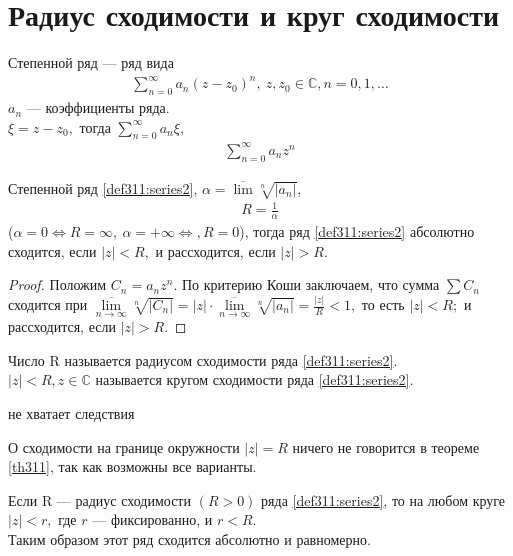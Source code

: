 \section{Радиус сходимости и круг сходимости}
\begin{definition}
  Степенной ряд --- ряд вида
  \begin{gather}
    \sum\limits_{n = 0}^{\infty} a_n(z - z_0)^n, \ z, z_0 \in \mathbb{C}, n = 0, 1, \dots
    \label{def311:series1}
  \end{gather}
  $a_n$ --- коэффициенты ряда. \\
  $\xi = z - z_0, $ тогда
  $\sum\limits_{n = 0}^{\infty} a_n \xi$,
  \begin{gather}
    \sum\limits_{n = 0}^{\infty} a_n z^n \label{def311:series2}
  \end{gather}
\end{definition}

\begin{theorem}
  \label{th311}
  Степенной ряд \eqref{def311:series2}, $\alpha = \overline{\lim} \sqrt[n]{|a_n|}$,
  \begin{gather}
    R = \frac{1}{\alpha} \label{def311:eq1}
  \end{gather}
  ($\alpha = 0 \Longleftrightarrow R = \infty, \
  \alpha = +\infty \Longleftrightarrow, R = 0$), тогда ряд \eqref{def311:series2}
  абсолютно сходится, если $|z| < R,$ и рассходится, если $|z| > R$.
\end{theorem}

\begin{proof}
  Положим $C_n = a_n z^n$. По критерию Коши заключаем, что сумма
  $\sum C_n$ сходится при $\overline{\lim\limits_{n \to \infty}} \sqrt[n]{|C_n|}
  = |z|\cdot \overline{\lim\limits_{n \to \infty}} \sqrt[n]{|a_n|} =
  \frac{|z|}{R} < 1,$ то есть $|z| < R;$ и рассходится, если $|z| > R$.
\end{proof}

\begin{definition}
  Число R называется радиусом сходимости ряда \eqref{def311:series2}. \\
  $|z| < R, z \in \mathbb{C}$ называется кругом сходимости ряда
  \eqref{def311:series2}.
\end{definition}
не хватает следствия
\begin{remark}
  О сходимости на границе окружности $|z| = R$ ничего не говорится в теореме
  \eqref{th311}, так как возможны все варианты.
\end{remark}

\begin{theorem}
  \label{th312}
  Если R --- радиус сходимости $(R > 0)$ ряда \eqref{def311:series2}, то на любом
  круге $|z| < r, $ где $r$ --- фиксированно, и $r < R$. \\
  Таким образом этот ряд сходится абсолютно и равномерно.
\end{theorem}

